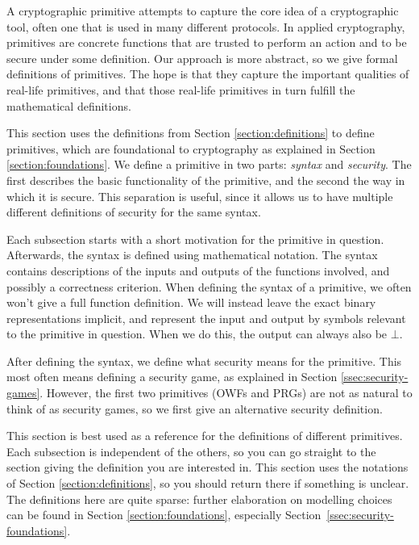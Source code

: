 A cryptographic primitive attempts to capture the core idea of a cryptographic tool, often one that is used in many different protocols. In applied cryptography, primitives are concrete functions that are trusted to perform an action and to be secure under some definition. Our approach is more abstract, so we give formal definitions of primitives. The hope is that they capture the important qualities of real-life primitives, and that those real-life primitives in turn fulfill the mathematical definitions.

This section uses the definitions from Section \ref{section:definitions} to define primitives, which are foundational to cryptography as explained in Section \ref{section:foundations}. We define a primitive in two parts: \emph{syntax} and \emph{security}. The first describes the basic functionality of the primitive, and the second the way in which it is secure. This separation is useful, since it allows us to have multiple different definitions of security for the same syntax.

Each subsection starts with a short motivation for the primitive in question. Afterwards, the syntax is defined using mathematical notation. The syntax contains descriptions of the inputs and outputs of the functions involved, and possibly a correctness criterion. When defining the syntax of a primitive, we often won't give a full function definition. We will instead leave the exact binary representations implicit, and represent the input and output by symbols relevant to the primitive in question. When we do this, the output can always also be $\bot$.

After defining the syntax, we define what security means for the primitive. This most often means defining a security game, as explained in Section \ref{ssec:security-games}. However, the first two primitives (OWFs and PRGs) are not as natural to think of as security games, so we first give an alternative security definition.

This section is best used as a reference for the definitions of different primitives. Each subsection is independent of the others, so you can go straight to the section giving the definition you are interested in. This section uses the notations of Section \ref{section:definitions}, so you should return there if something is unclear. The definitions here are quite sparse: further elaboration on modelling choices can be found in Section \ref{section:foundations}, especially Section~\ref{ssec:security-foundations}.